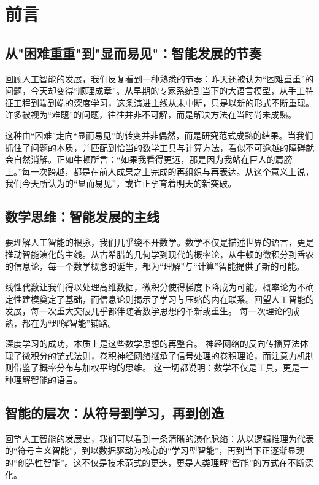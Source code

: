 
\chapter{ 前言}
\section{从"困难重重"到"显而易见"：智能发展的节奏}

回顾人工智能的发展，我们反复看到一种熟悉的节奏：昨天还被认为“困难重重”的问题，今天却变得“顺理成章”。从早期的专家系统到当下的大语言模型，从手工特征工程到端到端的深度学习，这条演进主线从未中断，只是以新的形式不断重现。许多被视为“难题”的问题，往往并非不可解，而是解决方法在当时尚未成熟。

这种由“困难”走向“显而易见”的转变并非偶然，而是研究范式成熟的结果。当我们抓住了问题的本质，并匹配到恰当的数学工具与计算方法，看似不可逾越的障碍就会自然消解。正如牛顿所言：“如果我看得更远，那是因为我站在巨人的肩膀上。”每一次跨越，都是在前人成果之上完成的再组织与再表达。从这个意义上说，我们今天所认为的“显而易见”，或许正孕育着明天的新突破。

\section{数学思维：智能发展的主线}
要理解人工智能的根脉，我们几乎绕不开数学。数学不仅是描述世界的语言，更是推动智能演化的主线。从古希腊的几何学到现代的概率论，从牛顿的微积分到香农的信息论，每一个数学概念的诞生，都为“理解”与“计算”智能提供了新的可能。

线性代数让我们得以处理高维数据，微积分使得梯度下降成为可能，概率论为不确定性建模奠定了基础，而信息论则揭示了学习与压缩的内在联系。回望人工智能的发展，每一次重大突破几乎都伴随着数学思想的革新或重生。
每一次理论的成熟，都在为“理解智能”铺路。

深度学习的成功，本质上是这些数学思想的再整合。
神经网络的反向传播算法体现了微积分的链式法则，卷积神经网络继承了信号处理的卷积理论，而注意力机制则借鉴了概率分布与加权平均的思维。
这一切都说明：数学不仅是工具，更是一种理解智能的语言。

\section{智能的层次：从符号到学习，再到创造}
回望人工智能的发展史，我们可以看到一条清晰的演化脉络：从以逻辑推理为代表的“符号主义智能”，到以数据驱动为核心的“学习型智能”，再到当下正逐渐显现的“创造性智能”。这不仅是技术范式的更迭，更是人类理解“智能”的方式在不断深化。

